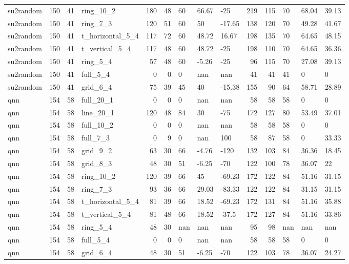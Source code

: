 \begin{longtable}{lrrlrrlllrrlll}
su2random & 150 & 41 & ring\_10\_2 & 180 & 48 & 60 & 66.67 & -25 & 219 & 115 & 70 & 68.04 & 39.13 \\
su2random & 150 & 41 & ring\_7\_3 & 120 & 51 & 60 & 50 & -17.65 & 138 & 120 & 70 & 49.28 & 41.67 \\
su2random & 150 & 41 & t\_horizontal\_5\_4 & 117 & 72 & 60 & 48.72 & 16.67 & 198 & 135 & 70 & 64.65 & 48.15 \\
su2random & 150 & 41 & t\_vertical\_5\_4 & 117 & 48 & 60 & 48.72 & -25 & 198 & 110 & 70 & 64.65 & 36.36 \\
su2random & 150 & 41 & ring\_5\_4 & 57 & 48 & 60 & -5.26 & -25 & 96 & 115 & 70 & 27.08 & 39.13 \\
su2random & 150 & 41 & full\_5\_4 & 0 & 0 & 0 & nan & nan & 41 & 41 & 41 & 0 & 0 \\
su2random & 150 & 41 & grid\_6\_4 & 75 & 39 & 45 & 40 & -15.38 & 155 & 90 & 64 & 58.71 & 28.89 \\
qnn & 154 & 58 & full\_20\_1 & 0 & 0 & 0 & nan & nan & 58 & 58 & 58 & 0 & 0 \\
qnn & 154 & 58 & line\_20\_1 & 120 & 48 & 84 & 30 & -75 & 172 & 127 & 80 & 53.49 & 37.01 \\
qnn & 154 & 58 & full\_10\_2 & 0 & 0 & 0 & nan & nan & 58 & 58 & 58 & 0 & 0 \\
qnn & 154 & 58 & full\_7\_3 & 0 & 9 & 0 & nan & 100 & 58 & 87 & 58 & 0 & 33.33 \\
qnn & 154 & 58 & grid\_9\_2 & 63 & 30 & 66 & -4.76 & -120 & 132 & 103 & 84 & 36.36 & 18.45 \\
qnn & 154 & 58 & grid\_8\_3 & 48 & 30 & 51 & -6.25 & -70 & 122 & 100 & 78 & 36.07 & 22 \\
qnn & 154 & 58 & ring\_10\_2 & 120 & 39 & 66 & 45 & -69.23 & 172 & 122 & 84 & 51.16 & 31.15 \\
qnn & 154 & 58 & ring\_7\_3 & 93 & 36 & 66 & 29.03 & -83.33 & 122 & 122 & 84 & 31.15 & 31.15 \\
qnn & 154 & 58 & t\_horizontal\_5\_4 & 81 & 39 & 66 & 18.52 & -69.23 & 172 & 131 & 84 & 51.16 & 35.88 \\
qnn & 154 & 58 & t\_vertical\_5\_4 & 81 & 48 & 66 & 18.52 & -37.5 & 172 & 127 & 84 & 51.16 & 33.86 \\
qnn & 154 & 58 & ring\_5\_4 & 48 & 30 & nan & nan & nan & 95 & 98 & nan & nan & nan \\
qnn & 154 & 58 & full\_5\_4 & 0 & 0 & 0 & nan & nan & 58 & 58 & 58 & 0 & 0 \\
qnn & 154 & 58 & grid\_6\_4 & 48 & 30 & 51 & -6.25 & -70 & 122 & 103 & 78 & 36.07 & 24.27 \\

\end{longtable}
